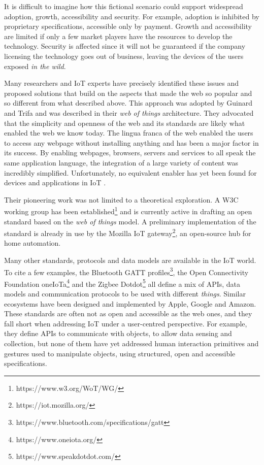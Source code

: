 It is difficult to imagine how this fictional scenario could support widespread adoption, growth, accessibility and security. For example, adoption is inhibited by proprietary specifications, accessible only by payment. Growth and accessibility are limited if only a few market players have the resources to develop the technology. Security is affected since it will not be guaranteed if the company licensing the technology goes out of business, leaving the devices of the users exposed \textit{in the wild}.

Many researchers and IoT experts have precisely identified these issues and proposed solutions that build on the aspects that made the web so popular and so different from what described above. This approach was adopted by Guinard and Trifa \autocite*{guinard_building_2016} and was described in their \textit{web of things} architecture. They advocated that the simplicity and openness of the web and its standards are likely what enabled the web we know today. The lingua franca of the web enabled the users to access any webpage without installing anything and has been a major factor in its success. By enabling webpages, browsers, servers and services to all speak the same application language, the integration of a large variety of content was incredibly simplified. Unfortunately, no equivalent enabler has yet been found for devices and applications in IoT \autocite[p. 23]{guinard_building_2016}.

Their pioneering work was not limited to a theoretical exploration. A W3C working group has been established\footnote{https://www.w3.org/WoT/WG/} and is currently active in drafting an open standard based on the \textit{web of things} model. A preliminary implementation of the standard is already in use by the Mozilla IoT gateway\footnote{https://iot.mozilla.org/}, an open-source hub for home automation.

Many other standards, protocols and data models are available in the IoT world. To cite a few examples, the Bluetooth GATT profiles\footnote{https://www.bluetooth.com/specifications/gatt}, the Open Connectivity Foundation oneIoTa\footnote{https://www.oneiota.org/} and the Zigbee Dotdot\footnote{https://www.speakdotdot.com/} all define a mix of APIs, data models and communication protocols to be used with different \textit{things}. Similar ecosystems have been designed and implemented by Apple, Google and Amazon.
These standards are often not as open and accessible as the web ones, and they fall short when addressing IoT under a user-centred perspective. For example, they define APIs to communicate with objects, to allow data sensing and collection, but none of them have yet addressed human interaction primitives and gestures used to manipulate objects, using structured, open and accessible specifications.


